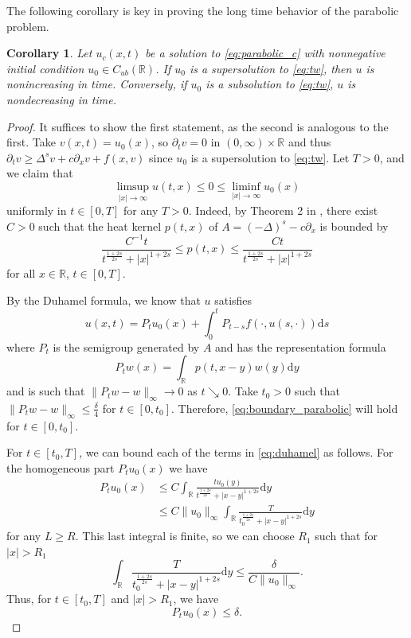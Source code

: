 \documentclass[11pt,a4paper]{amsart}
\newcommand{\R}{\mathbb{R}}
\newcommand{\dy}{\mathrm{d}y}
\newcommand{\ds}{\mathrm{d}s}
\newtheorem{cor}[thm]{Corollary}
\begin{document}
The following corollary is key in proving the long time behavior of the parabolic problem. 

\begin{cor}
\label{cor:monotonicity}
Let $u_c(x,t)$ be a solution to \eqref{eq:parabolic_c} with nonnegative initial condition $u_0 \in C_{ub}(\R)$. If $u_0$ is a supersolution to \eqref{eq:tw}, then $u$ is nonincreasing in time. Conversely, if $u_0$ is a subsolution to \eqref{eq:tw}, $u$ is nondecreasing in time.
\end{cor}
\begin{proof}
It suffices to show the first statement, as the second is analogous to the first. Take $v(x,t) = u_0(x)$, so $\partial_t v = 0$ in $(0,\infty) \times \R$ and thus $\partial_t v \geq \Delta ^s v +c\partial_x v + f(x,v)$ since $u_0$ is a supersolution to \eqref{eq:tw}. Let $T>0$, and we claim that 
\begin{equation}
\label{eq:boundary_parabolic}
\limsup_{|x|\rightarrow\infty} u (t,x) \leq 0 \leq \liminf_{|x|\rightarrow \infty} u_0(x)
\end{equation}
uniformly in $t\in [0,T]$ for any $T>0$. Indeed, by Theorem 2 in \cite{BJ07}, there exist $C>0$ such that the heat kernel $p(t,x)$ of $A = (-\Delta)^s - c\partial_x$ is bounded by
\[\frac{C^{-1}t}{t^{\frac{1+2s}{2s}} + |x|^{1+2s}} \leq p(t,x) \leq \frac{Ct}{t^{\frac{1+2s}{2s}} + |x|^{1+2s}}\] 
for all $x \in \R$, $t\in [0,T]$. 

By the Duhamel formula, we know that $u$ satisfies
\begin{equation}
\label{eq:duhamel}
u(x,t) = P_t u_0(x) + \int_0^t P_{t-s} f(\cdot, u(s,\cdot))\ds
\end{equation}
where $P_t$ is the semigroup generated by $A$ and has the representation formula
\[P_tw(x) = \int_{\R} p(t,x-y) w(y) \dy\]
and is such that $\|P_t w - w  \|_{\infty} \rightarrow 0$ as $t\searrow 0$. Take $t_0>0$ such that $\| P_t w - w \|_{\infty} \leq \frac{\delta}{4}$ for $t\in [0,t_0]$. Therefore, \eqref{eq:boundary_parabolic} will hold for $t\in [0,t_0]$.  

For $t\in [t_0, T]$, we can bound each of the terms in \eqref{eq:duhamel} as follows. For the homogeneous part $P_t u_0(x)$ we have
\begin{align*}
P_tu_0(x) &\leq C\int_{\R}\frac{tu_0(y)}{t^{\frac{1+2s}{2s}} + |x-y|^{1+2s}}\dy \\
&\leq C\|u_0\|_{\infty}   \int_{\R} \frac{T}{t_0^{\frac{1+2s}{2s}} + |x-y|^{1+2s}}\dy
\end{align*}
for any $L \geq R$. This last integral is finite, so we can choose $R_1$ such that for $|x| > R_1$
\[ \int_{\R} \frac{T}{t_0^{\frac{1+2s}{2s}} + |x-y|^{1+2s}}\dy \leq \frac{\delta}{C\|u_0\|_{\infty}}.\] 
Thus, for $t\in [t_0, T]$ and $|x| >R_1$, we have
\[P_t u_0(x) \leq  \delta.\]


\end{proof}
\end{document}

